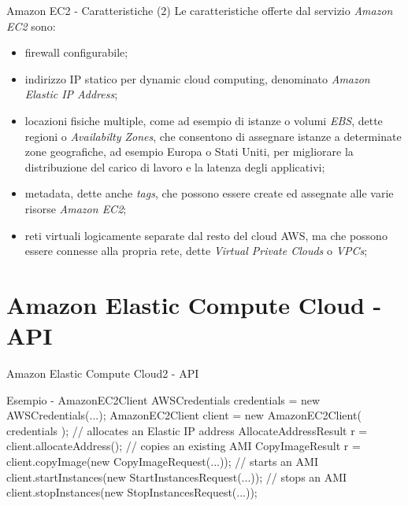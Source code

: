 \documentclass{beamer}
\begin{document}
\begin{frame}{Amazon EC2 - Caratteristiche (2)}
Le caratteristiche offerte dal servizio \emph{Amazon EC2} sono:
\begin{itemize}
\item firewall configurabile;
\item indirizzo IP statico per dynamic cloud computing, denominato \emph{Amazon Elastic IP Address};
\item locazioni fisiche multiple, come ad esempio di istanze o volumi \emph{EBS}, dette regioni o \emph{Availabilty Zones}, che consentono di assegnare istanze a determinate
zone geografiche, ad esempio Europa o Stati Uniti, per migliorare la distribuzione del carico di lavoro e la latenza degli applicativi;
\item metadata, dette anche \emph{tags}, che possono essere create ed assegnate alle varie risorse \emph{Amazon EC2};
\item reti virtuali logicamente separate dal resto del cloud AWS, ma che possono essere connesse alla propria rete, dette \emph{Virtual Private Clouds} o \emph{VPCs};
\end{itemize}
\end{frame}


\section{Amazon Elastic Compute Cloud - API}
\begin{frame}{Amazon Elastic Compute Cloud2 - API}
\begin{exampleblock}{Esempio - AmazonEC2Client}
{\small
AWSCredentials credentials = new AWSCredentials(...);
\newline
AmazonEC2Client client = new AmazonEC2Client( credentials );
\newline
 // allocates an Elastic IP address
\newline
AllocateAddressResult r = client.allocateAddress();
\newline
// copies an existing AMI
CopyImageResult r = client.copyImage(new CopyImageRequest(...));
\newline
// starts an AMI
\newline
client.startInstances(new StartInstancesRequest(...));
\newline
// stops an AMI
\newline
client.stopInstances(new StopInstancesRequest(...));
}
\end{exampleblock}
\end{frame}
\end{document}
